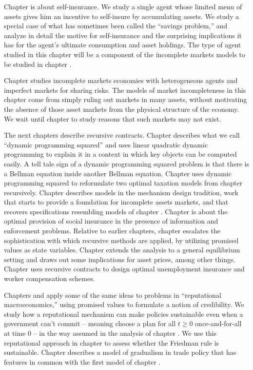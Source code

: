 Chapter  is about self-insurance.  We study
 a single agent whose limited menu
of assets gives him  an incentive
to self-insure by accumulating assets.     We study
a special case of what has sometimes been called
the ``savings problem,'' and analyze in detail the motive for
self-insurance and the surprising implications it
has  for the agent's ultimate consumption and asset holdings.
The type of agent studied in this chapter will be a component
of the incomplete markets models to be studied in chapter .

    Chapter  studies incomplete
markets economies with heterogeneous agents and imperfect markets
for sharing risks.  The models of market incompleteness in this
chapter  come from simply ruling out markets in many assets,
without motivating  the absence of those asset markets   from the
physical structure of the economy. We  wait until chapter
 to study   reasons that such markets may not
exist.

The next chapters describe   recursive
contracts.   Chapter
 describes what we
call ``dynamic programming squared'' and uses   linear quadratic dynamic programming
to explain it in a context in which key objects can be computed easily. A tell tale sign of a dynamic programming squared problem
is that there is a Bellman equation inside another Bellman equation.  Chapter 
uses dynamic programming squared  to reformulate two optimal taxation models
from  chapter  recursively.
 Chapter  describes models in
the mechanism design tradition, work that starts to provide
a foundation for incomplete assets markets, and that recovers
specifications resembling  models
of chapter . Chapter 
is about the optimal
provision of social insurance in the presence
of information  and enforcement problems.
 Relative to earlier chapters, chapter   escalates
the sophistication with which recursive methods are applied, by
utilizing promised values as state variables. Chapter
 extends the analysis to a general
equilibrium setting and draws out some implications for asset
prices, among other things. Chapter  uses recursive
contracts to design optimal unemployment insurance and
worker compensation schemes.

Chapters  and  apply some of the same ideas to  problems
in ``reputational macroeconomics,'' using promised values to
formulate a notion of credibility. We study how a  reputational
mechanism can make policies sustainable even when a government can't commit -- meaning choose a plan for all $t \geq 0$  once-and-for-all at time $0$ -- in the way
 assumed in the
 analysis of chapter . We use this reputational approach
in chapter  to assess whether the Friedman rule is sustainable. Chapter
 describes a model of gradualism  in trade policy
that has  features in common with the first model of chapter
.

